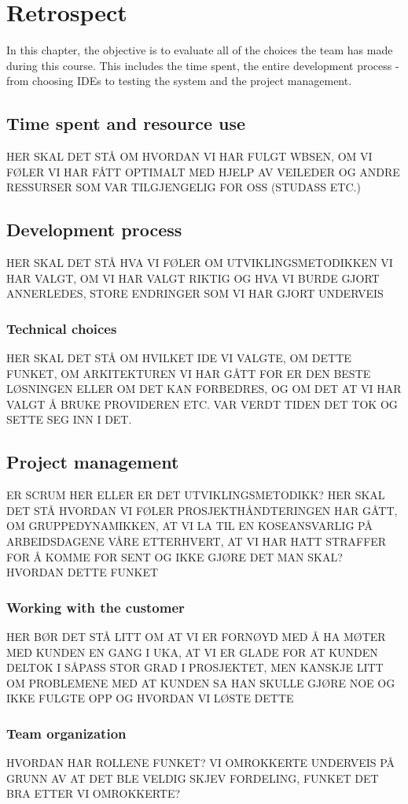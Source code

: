 \chapter{Retrospect}
In this chapter, the objective is to evaluate all of the choices the team has made during this course. This includes the time spent, the entire development process - from choosing IDEs to testing the system and the project management. 

\section{Time spent and resource use}
HER SKAL DET STÅ OM HVORDAN VI HAR FULGT WBSEN, OM VI FØLER VI HAR FÅTT OPTIMALT MED HJELP AV VEILEDER OG ANDRE RESSURSER SOM VAR TILGJENGELIG FOR OSS (STUDASS ETC.)

\section{Development process}
HER SKAL DET STÅ HVA VI FØLER OM UTVIKLINGSMETODIKKEN VI HAR VALGT, OM VI HAR VALGT RIKTIG OG HVA VI BURDE GJORT ANNERLEDES, STORE ENDRINGER SOM VI HAR GJORT UNDERVEIS
\subsection{Technical choices}
HER SKAL DET STÅ OM HVILKET IDE VI VALGTE, OM DETTE FUNKET, OM ARKITEKTUREN VI HAR GÅTT FOR ER DEN BESTE LØSNINGEN ELLER OM DET KAN FORBEDRES, OG OM DET AT VI HAR VALGT Å BRUKE PROVIDEREN ETC. VAR VERDT TIDEN DET TOK OG SETTE SEG INN I DET.

\section{Project management}
ER SCRUM HER ELLER ER DET UTVIKLINGSMETODIKK? HER SKAL DET STÅ HVORDAN VI FØLER PROSJEKTHÅNDTERINGEN HAR GÅTT, OM GRUPPEDYNAMIKKEN, AT VI LA TIL EN KOSEANSVARLIG PÅ ARBEIDSDAGENE VÅRE ETTERHVERT, AT VI HAR HATT STRAFFER FOR Å KOMME FOR SENT OG IKKE GJØRE DET MAN SKAL? HVORDAN DETTE FUNKET
\subsection{Working with the customer}
HER BØR DET STÅ LITT OM AT VI ER FORNØYD MED Å HA MØTER MED KUNDEN EN GANG I UKA, AT VI ER GLADE FOR AT KUNDEN DELTOK I SÅPASS STOR GRAD I PROSJEKTET, MEN KANSKJE LITT OM PROBLEMENE MED AT KUNDEN SA HAN SKULLE GJØRE NOE OG IKKE FULGTE OPP OG HVORDAN VI LØSTE DETTE
\subsection{Team organization}
HVORDAN HAR ROLLENE FUNKET? VI OMROKKERTE UNDERVEIS PÅ GRUNN AV AT DET BLE VELDIG SKJEV FORDELING, FUNKET DET BRA ETTER VI OMROKKERTE?

